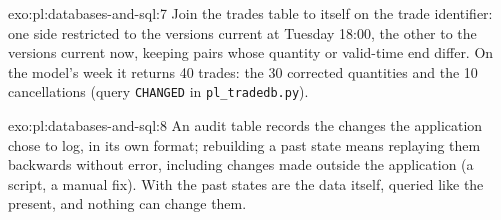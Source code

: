 \begin{solution}{exo:pl:databases-and-sql:7}
Join the trades table to itself on the trade identifier: one side restricted to the versions current at  Tuesday 18:00, the other to
the versions current now, keeping pairs whose quantity or valid-time end differ. On the model's week it returns 40 trades: the 30 corrected
quantities and the 10 cancellations (query \texttt{CHANGED} in \texttt{pl\_tradedb.py}).
\end{solution}

\begin{solution}{exo:pl:databases-and-sql:8}
An audit table records the changes the application chose to log, in its own format; rebuilding a past state means replaying them backwards
without error, including changes made outside the application (a script, a manual fix). With  the past states are the data
itself, queried like the present, and nothing can change them.
\end{solution}

